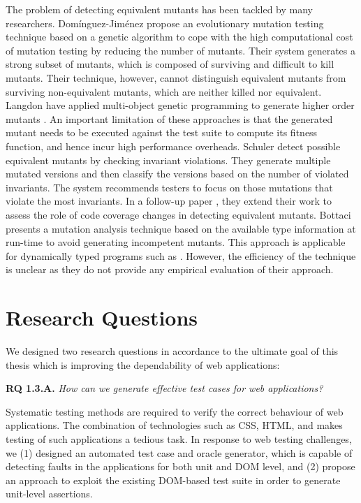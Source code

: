 The problem of detecting equivalent mutants has been tackled by many researchers.
Dom\'inguez-Jim\'enez \etal \cite{dominguez:ist11} propose an evolutionary mutation testing
technique based on a genetic algorithm to cope with the high computational cost of mutation 
testing by reducing the number of mutants. Their system generates a strong subset
of mutants, which is composed of surviving and difficult to kill mutants. 
Their technique, however, cannot distinguish equivalent mutants from surviving non-equivalent mutants, which are neither killed nor
equivalent.
Langdon \etal have applied multi-object genetic programming to generate higher order mutants 
\cite{langdon:jss10}.
An important limitation of these approaches is that the generated
mutant needs to be executed against the test suite to compute its fitness function, and hence incur high performance overheads.
Schuler \etal \cite{schuler:issta09} detect possible equivalent mutants by checking invariant violations. They
generate multiple mutated versions and then classify the versions based on the number of violated invariants.
The system recommends testers to focus on those mutations that violate the most invariants.
In a follow-up paper \cite{schuler:icst10}, they extend their work to assess the role of code coverage changes in detecting equivalent mutants. 
Bottaci \cite{bottaci:icstw10} presents a mutation analysis technique based on the available type information at run-time to avoid generating incompetent mutants. This approach is applicable for dynamically typed programs such as \javascript. However, the efficiency of the technique is unclear as they do not provide any empirical evaluation of their approach. 

\section{Research Questions} \label{Sec:researchq}
We designed two research questions in accordance to the ultimate goal of this thesis which is improving the dependability of \javascript web applications:

{\bf RQ 1.3.A.} \emph{How can we generate effective test cases for \javascript web applications?}

Systematic testing methods are required to verify the correct behaviour of web applications. The combination of technologies such as CSS, HTML, and \javascript makes testing of such applications a tedious task.
In response to web testing challenges, we (1) designed an automated test case and oracle generator, which is capable of detecting faults
in the \javascript applications for both unit and DOM level, and (2) propose an approach to exploit the existing DOM-based test suite in order to generate unit-level assertions. 

